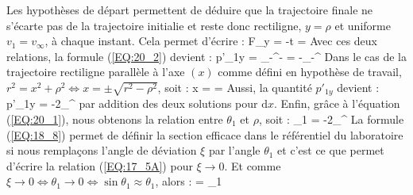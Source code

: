 Les hypoth\`eses de d\'epart permettent de d\'eduire que la trajectoire finale ne s'\'ecarte pas de la trajectoire initialie et reste donc rectiligne, $y = \rho$ et uniforme $v_{1} = v_{\infty}$, \`a chaque instant. Cela permet d'\'ecrire :
\be
	F_{y} = -t = 
\ee
Avec ces deux relations, la formule (\ref{EQ:20_2}) devient :
\be
	p'_{1y} = \int_{-\infty}^{\infty}- = -\int_{-\infty}^{\infty}
\ee
Dans le cas de la trajectoire rectiligne parall\`ele \`a l'axe $(x)$ comme d\'efini en hypoth\`ese de travail, $r^{2} = x^{2} + \rho^{2} \Leftrightarrow x = \pm\sqrt{r^{2} - \rho^{2}}$, soit :
\be
	x = \pm{} = \pm{}
\ee
Aussi, la quantit\'e $p'_{1y}$ devient :
\be
	p'_{1y} = -2\int_{\rho}^{\infty}
\ee
par addition des deux solutions pour $\mathrm{d}x$. Enfin, gr\^ace \`a l'\'equation (\ref{EQ:20_1}), nous obtenons la relation entre $\theta_{1}$ et $\rho$, soit :
\be
	\theta_{1} = -2\int_{\rho}^{\infty} \label{EQ:20_3}
\ee
La formule (\ref{EQ:18_8}) permet de d\'efinir la section efficace dans le r\'ef\'erentiel du laboratoire si nous rempla\c{c}ons l'angle de d\'eviation $\xi$ par l'angle $\theta_{1}$ et c'est ce que permet d'\'ecrire la relation (\ref{EQ:17_5A}) pour $\xi \rightarrow 0$. Et comme $\xi \rightarrow 0 \Leftrightarrow \theta_{1} \rightarrow 0 \Leftrightarrow \sin\theta_{1} \approx \theta_{1}$, alors :
\be
	\sigma = \lvert {} \rvert {}\omega_{1} \label{EQ:20_4}
\ee
